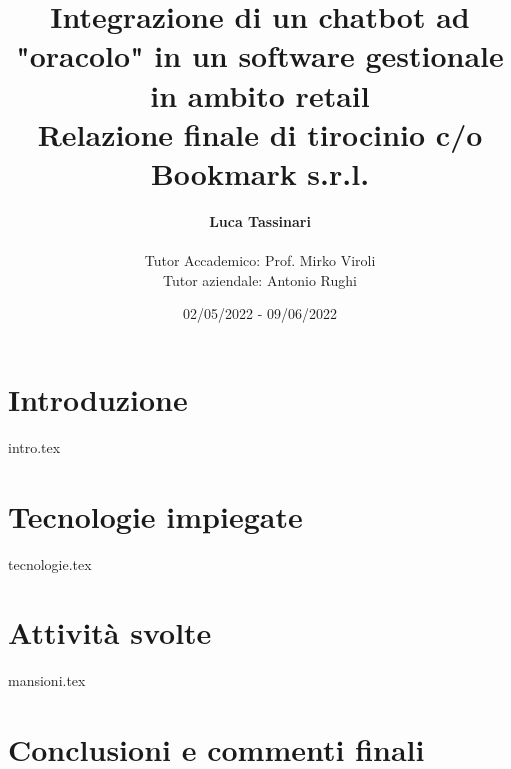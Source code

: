\documentclass[a4paper,11pt]{report}
\title{
	Integrazione di un chatbot ad "oracolo" in un software gestionale in ambito  retail \\
	\large Relazione finale di tirocinio c/o Bookmark s.r.l.
}
\author{
	\textbf{Luca Tassinari} \\\\
	Tutor Accademico: Prof. Mirko Viroli \\
	Tutor aziendale: Antonio Rughi
}
\date{02/05/2022 - 09/06/2022}
\begin{document}
\maketitle

\tableofcontents

\chapter[Introduzione]{Introduzione}
{intro.tex}

\chapter[Tecnologie]{Tecnologie impiegate}
{tecnologie.tex}

\chapter[Attività]{Attività svolte}
{mansioni.tex}

\chapter[Conclusioni]{Conclusioni e commenti finali}



\end{document}
